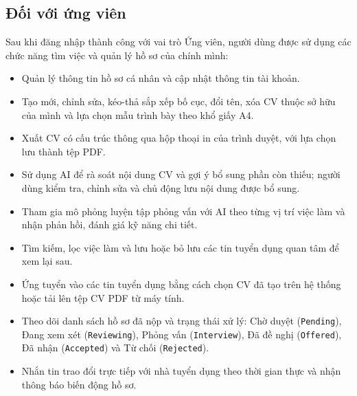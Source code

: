 \subsection{Đối với ứng viên}
Sau khi đăng nhập thành công với vai trò Ứng viên, người dùng được sử dụng các chức năng tìm việc và quản lý hồ sơ của chính mình:
\begin{itemize}
    \item Quản lý thông tin hồ sơ cá nhân và cập nhật thông tin tài khoản.
    \item Tạo mới, chỉnh sửa, kéo-thả sắp xếp bố cục, đổi tên, xóa CV thuộc sở hữu của mình và lựa chọn mẫu trình bày theo khổ giấy A4.
    \item Xuất CV có cấu trúc thông qua hộp thoại in của trình duyệt, với lựa chọn lưu thành tệp PDF.
    \item Sử dụng AI để rà soát nội dung CV và gợi ý bổ sung phần còn thiếu; người dùng kiểm tra, chỉnh sửa và chủ động lưu nội dung được bổ sung.
    \item Tham gia mô phỏng luyện tập phỏng vấn với AI theo từng vị trí việc làm và nhận phản hồi, đánh giá kỹ năng chi tiết.
    \item Tìm kiếm, lọc việc làm và lưu hoặc bỏ lưu các tin tuyển dụng quan tâm để xem lại sau.
    \item Ứng tuyển vào các tin tuyển dụng bằng cách chọn CV đã tạo trên hệ thống hoặc tải lên tệp CV PDF từ máy tính.
    \item Theo dõi danh sách hồ sơ đã nộp và trạng thái xử lý: Chờ duyệt (\texttt{Pending}), Đang xem xét (\texttt{Reviewing}), Phỏng vấn (\texttt{Interview}), Đã đề nghị (\texttt{Offered}), Đã nhận (\texttt{Accepted}) và Từ chối (\texttt{Rejected}).
    \item Nhắn tin trao đổi trực tiếp với nhà tuyển dụng theo thời gian thực và nhận thông báo biến động hồ sơ.
\end{itemize}

